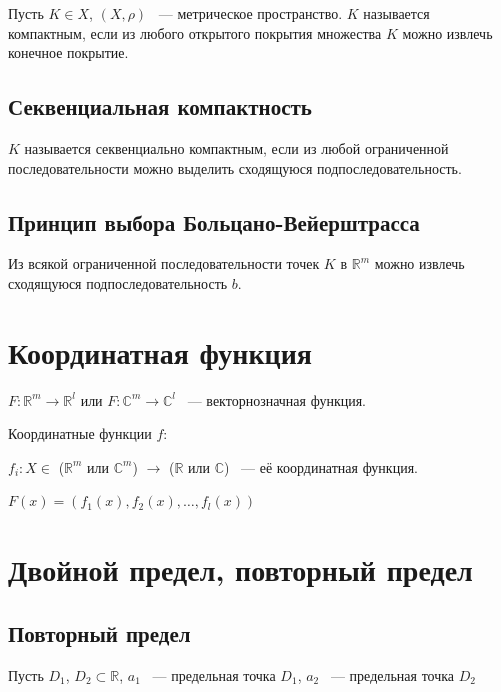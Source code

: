 \documentclass{article}
\begin{document}
            Пусть $K \in X$, $(X, \rho)$ ~--- метрическое пространство. $K$ называется компактным, если из любого открытого покрытия множества $K$ можно извлечь конечное покрытие. 
        
        \subsection{Секвенциальная компактность}
            
            $K$ называется секвенциально компактным, если из любой ограниченной последовательности можно выделить сходящуюся подпоследовательность.
        
        \subsection{Принцип выбора Больцано-Вейерштрасса}
        
            Из всякой ограниченной последовательности точек $K$ в $\mathbb{R}^m$ можно извлечь сходящуюся подпоследовательность $b$.
            
    \newpage
    
    \section{Координатная функция}
    
        $F : \mathbb{R}^m \rightarrow \mathbb{R}^l$ или $F : \mathbb{C}^m \rightarrow \mathbb{C}^l$ ~--- векторнозначная функция.
        
        Координатные функции $f$:
        
        $f_i : X \in$ ($\mathbb{R}^m$ или $\mathbb{C}^m$) $\rightarrow$ ($\mathbb{R}$ или $\mathbb{C}$) ~--- её координатная функция.
        
        $F(x) = (f_1(x), f_2(x), \ldots, f_l(x))$
        
    \newpage
    
    \section{Двойной предел, повторный предел}
    
        \subsection{Повторный предел}
        
            Пусть $D_1$, $D_2 \subset \mathbb{R}$, $a_1$ ~--- предельная точка $D_1$, $a_2$ ~--- предельная точка $D_2$
        
\end{document}
